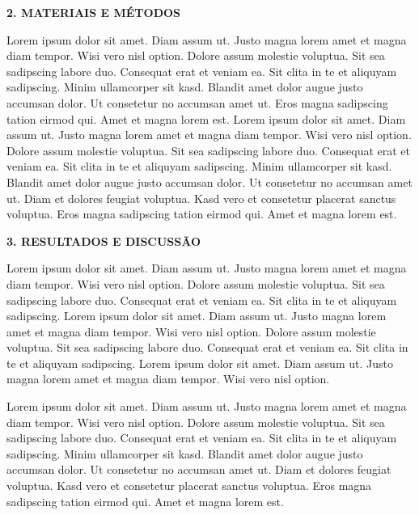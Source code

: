\documentclass[final]{beamer}
\begin{document}
\begin{frame}[t]
\begin{columns}[t,totalwidth=0.6\paperwidth]
\begin{column}{0.45\paperwidth}
    \vspace{1.3cm}
    {\large\bfseries 2. MATERIAIS E MÉTODOS}\par
    \justifying
    \vspace{1.3cm}
  Lorem ipsum dolor sit amet. Diam assum ut. Justo magna lorem amet et magna diam tempor. Wisi vero nisl option. Dolore assum molestie voluptua. Sit sea sadipscing labore duo. Consequat erat et veniam ea. Sit clita in te et aliquyam sadipscing. Minim ullamcorper sit kasd. Blandit amet dolor augue justo accumsan dolor. Ut consetetur no accumsan amet ut. Eros magna sadipscing tation eirmod qui. Amet et magna lorem est.
    Lorem ipsum dolor sit amet. Diam assum ut. Justo magna lorem amet et magna diam tempor. Wisi vero nisl option. Dolore assum molestie voluptua. Sit sea sadipscing labore duo. Consequat erat et veniam ea. Sit clita in te et aliquyam sadipscing. Minim ullamcorper sit kasd. Blandit amet dolor augue justo accumsan dolor. Ut consetetur no accumsan amet ut. Diam et dolores feugiat voluptua. Kasd vero et consetetur placerat sanctus voluptua. Eros magna sadipscing tation eirmod qui. Amet et magna lorem est.

      \vspace{1.3cm}


    \vspace{1em}
    {\large\bfseries 3. RESULTADOS E DISCUSSÃO}\par
    \justifying
    \vspace{1.3cm}
    	 Lorem ipsum dolor sit amet. Diam assum ut. Justo magna lorem amet et magna diam tempor. Wisi vero nisl option. Dolore assum molestie voluptua. Sit sea sadipscing labore duo. Consequat erat et veniam ea. Sit clita in te et aliquyam sadipscing. 
	 Lorem ipsum dolor sit amet. Diam assum ut. Justo magna lorem amet et magna diam tempor. Wisi vero nisl option. Dolore assum molestie voluptua. Sit sea sadipscing labore duo. Consequat erat et veniam ea. Sit clita in te et aliquyam sadipscing. 
	 Lorem ipsum dolor sit amet. Diam assum ut. Justo magna lorem amet et magna diam tempor. Wisi vero nisl option.

  Lorem ipsum dolor sit amet. Diam assum ut. Justo magna lorem amet et magna diam tempor. Wisi vero nisl option. Dolore assum molestie voluptua. Sit sea sadipscing labore duo. Consequat erat et veniam ea. Sit clita in te et aliquyam sadipscing. Minim ullamcorper sit kasd. Blandit amet dolor augue justo accumsan dolor. Ut consetetur no accumsan amet ut. Diam et dolores feugiat voluptua. Kasd vero et consetetur placerat sanctus voluptua. Eros magna sadipscing tation eirmod qui. Amet et magna lorem est.




\end{column}
\end{columns}
\end{frame}
\end{document}
